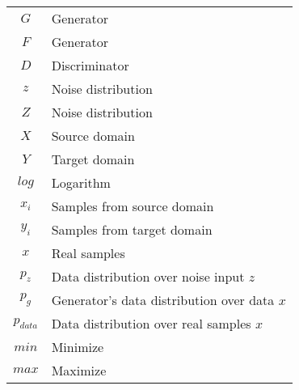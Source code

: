 

\begin{tabular}{cp{}}
  $G$ & Generator \\
  $F$ &  Generator \\
  $D$ & Discriminator \\
  $z$  & Noise distribution\\
  $Z$  & Noise distribution\\
  $X$  & Source domain\\
  $Y$  & Target domain\\
  $log$ & Logarithm \\
  $x_i$  & Samples from source domain\\
  $y_i$  & Samples from target domain\\
  
  
  $x$ & Real samples\\
  $p_z$ & Data distribution over noise input $z$\\
  $p_g$ & Generator’s data distribution over data $x$\\
  $p_{data}$ & Data distribution over real samples $x$\\
  $min$ & Minimize\\
  $max$ & Maximize\\



  
\end{tabular}\\